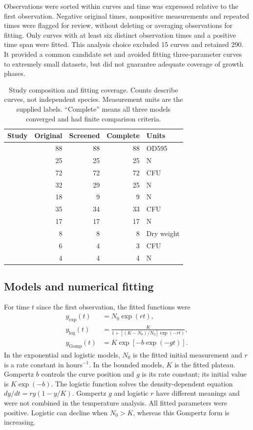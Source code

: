 \documentclass[11pt,a4paper]{article}
\begin{document}
Observations were sorted within curves and time was expressed relative to the first observation. Negative original times, nonpositive measurements and repeated times were flagged for review, without deleting or averaging observations for fitting. Only curves with at least six distinct observation times and a positive time span were fitted. This analysis choice excluded 15 curves and retained 290. It provided a common candidate set and avoided fitting three-parameter curves to extremely small datasets, but did not guarantee adequate coverage of growth phases.

\begin{table}[htbp]
\centering\small
\caption{Study composition and fitting coverage. Counts describe curves, not independent species. Measurement units are the supplied labels. ``Complete'' means all three models converged and had finite comparison criteria.}
\label{tab:studies}
\begin{tabular}{lrrrl}
\toprule
Study & Original & Screened & Complete & Units\\
\midrule
\citet{Bae2014} & 88 & 88 & 88 & OD595\\
\citet{Bernhardt2018} & 25 & 25 & 25 & N\\
\citet{Galarz2016} & 72 & 72 & 72 & CFU\\
\citet{Gill1991} & 32 & 29 & 25 & N\\
\citet{Phillips1987} & 18 & 9 & 9 & N\\
\citet{Roth1962} & 35 & 34 & 33 & CFU\\
\citet{Silva2018} & 17 & 17 & 17 & N\\
\citet{Sivonen1990} & 8 & 8 & 8 & Dry weight\\
\citet{Stannard1985} & 6 & 4 & 3 & CFU\\
\citet{Zwietering1994} & 4 & 4 & 4 & N\\
\bottomrule
\end{tabular}
\end{table}

\subsection{Models and numerical fitting}
For time $t$ since the first observation, the fitted functions were
\begin{align}
 y_{\mathrm{exp}}(t)&=N_0\exp(rt),\\
 y_{\mathrm{log}}(t)&=\frac{K}{1+[(K-N_0)/N_0]\exp(-rt)},\\
 y_{\mathrm{Gomp}}(t)&=K\exp[-b\exp(-gt)].
\end{align}
In the exponential and logistic models, $N_0$ is the fitted initial measurement and $r$ is a rate constant in hours$^{-1}$. In the bounded models, $K$ is the fitted plateau. Gompertz $b$ controls the curve position and $g$ is its rate constant; its initial value is $K\exp(-b)$. The logistic function solves the density-dependent equation $dy/dt=ry(1-y/K)$. Gompertz $g$ and logistic $r$ have different meanings and were not combined in the temperature analysis. All fitted parameters were positive. Logistic can decline when $N_0>K$, whereas this Gompertz form is increasing.
\end{document}

